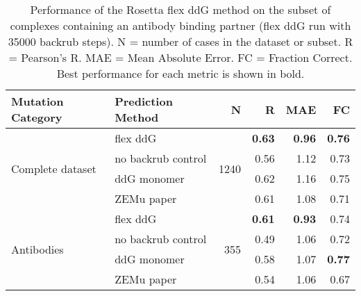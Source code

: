 \begin{table}
  \begin{tabular}{llrrrr}
\toprule
Mutation Category &   Prediction Method &     N &    R &  MAE &   FC \\
\midrule
 \multirow{ 4}{*}{Complete dataset} & flex ddG & \multirow{ 4}{*}{1240} & \textbf{0.63} & \textbf{0.96} & \textbf{0.76}  \\
 & no backrub control & & 0.56 & 1.12 & 0.73  \\
 & ddG monomer & & 0.62 & 1.16 & 0.75  \\
 & ZEMu paper & & 0.61 & 1.08 & 0.71  \\
\hline
 \multirow{ 4}{*}{Antibodies} & flex ddG & \multirow{ 4}{*}{355} & \textbf{0.61} & \textbf{0.93} & 0.74  \\
 & no backrub control & & 0.49 & 1.06 & 0.72  \\
 & ddG monomer & & 0.58 & 1.07 & \textbf{0.77}  \\
 & ZEMu paper & & 0.54 & 1.06 & 0.67  \\
\bottomrule
\end{tabular}
  \caption[Flex ddG performance on antibodies]{
    Performance of the Rosetta flex ddG method on the subset of complexes containing an antibody binding partner (flex ddG run with 35000 backrub steps). N = number of cases in the dataset or subset. R = Pearson's R. MAE = Mean Absolute Error. FC = Fraction Correct. Best performance for each metric is shown in bold.
  } \label{tab:table-antibodies}
\end{table}
